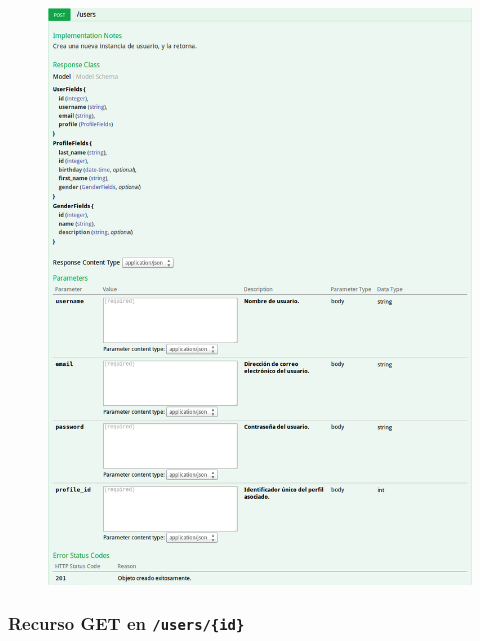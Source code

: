 \begin{figure}[h]
  \centering
  \includegraphics[width=\textwidth,height=.75\textheight,keepaspectratio]{img/especificacion_api/userList_post}
  \label{userList_post}
\end{figure}

\newpage


\subsubsection{Recurso GET en \texttt{/users/\{id\}}}

